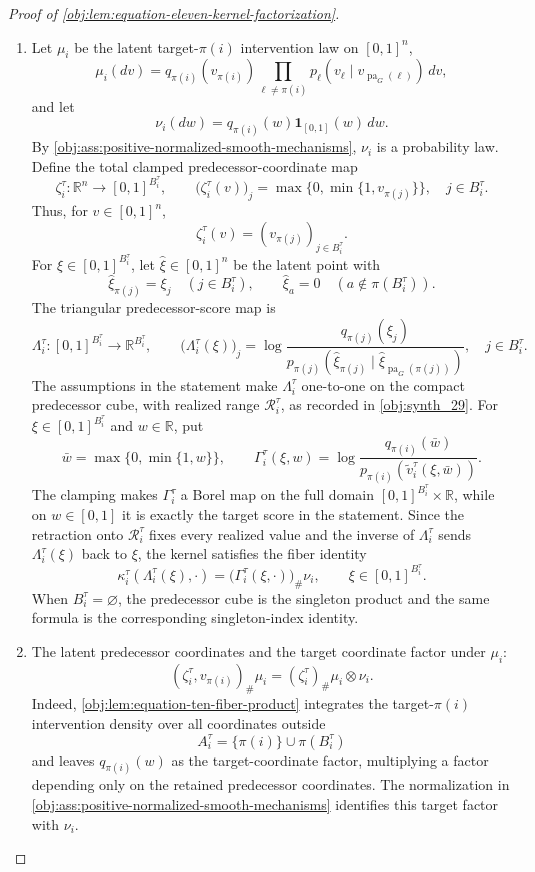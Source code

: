 \documentclass[11pt]{article}
\begin{document}
\begin{proof}[Proof of \cref{obj:lem:equation-eleven-kernel-factorization}]
\begin{enumerate}
\item Let \(\mu_i\) be the latent target-\(\pi(i)\) intervention law on \([0,1]^n\),
\[
\mu_i(dv)
=
q_{\pi(i)}(v_{\pi(i)})
\prod_{\ell\ne \pi(i)}
p_\ell(v_\ell\mid v_{\operatorname{pa}_G(\ell)})\,dv,
\]
and let
\[
\nu_i(dw)=q_{\pi(i)}(w)\mathbf 1_{[0,1]}(w)\,dw .
\]
By \cref{obj:ass:positive-normalized-smooth-mechanisms}, \(\nu_i\) is a probability law. Define the total clamped predecessor-coordinate map
\[
\zeta_i^\tau:\mathbb R^n\longrightarrow [0,1]^{B_i^\tau},
\qquad
\bigl(\zeta_i^\tau(v)\bigr)_j
=
\max\{0,\min\{1,v_{\pi(j)}\}\},
\quad j\in B_i^\tau .
\]
Thus, for \(v\in[0,1]^n\),
\[
\zeta_i^\tau(v)=(v_{\pi(j)})_{j\in B_i^\tau}.
\]
For \(\xi\in[0,1]^{B_i^\tau}\), let \(\widehat \xi\in[0,1]^n\) be the latent point with
\[
\widehat \xi_{\pi(j)}=\xi_j\quad (j\in B_i^\tau),
\qquad
\widehat \xi_a=0\quad (a\notin \pi(B_i^\tau)).
\]
The triangular predecessor-score map is
\[
\Lambda_i^\tau:[0,1]^{B_i^\tau}\to\mathbb R^{B_i^\tau},
\qquad
\bigl(\Lambda_i^\tau(\xi)\bigr)_j
=
\log
\frac{q_{\pi(j)}(\xi_j)}
{p_{\pi(j)}\!\left(\widehat \xi_{\pi(j)}\mid
\widehat \xi_{\operatorname{pa}_G(\pi(j))}\right)},
\quad j\in B_i^\tau .
\]
The assumptions in the statement make \(\Lambda_i^\tau\) one-to-one on the compact predecessor cube, with realized range \(\mathcal R_i^\tau\), as recorded in \cref{obj:synth_29}. For \(\xi\in[0,1]^{B_i^\tau}\) and \(w\in\mathbb R\), put
\[
\bar w=\max\{0,\min\{1,w\}\},
\qquad
\Gamma_i^\tau(\xi,w)
=
\log
\frac{q_{\pi(i)}(\bar w)}
{p_{\pi(i)}\!\left(\widetilde v_i^\tau(\xi,\bar w)\right)} .
\]
The clamping makes \(\Gamma_i^\tau\) a Borel map on the full domain
\([0,1]^{B_i^\tau}\times\mathbb R\), while on \(w\in[0,1]\) it is exactly the target score in the statement. Since the retraction onto \(\mathcal R_i^\tau\) fixes every realized value and the inverse of \(\Lambda_i^\tau\) sends \(\Lambda_i^\tau(\xi)\) back to \(\xi\), the kernel satisfies the fiber identity
\[
\kappa_i^\tau(\Lambda_i^\tau(\xi),\cdot)
=
\bigl(\Gamma_i^\tau(\xi,\cdot)\bigr)_{\#}\nu_i,
\qquad
\xi\in[0,1]^{B_i^\tau}.
\]
When \(B_i^\tau=\varnothing\), the predecessor cube is the singleton product and the same formula is the corresponding singleton-index identity. %

\item The latent predecessor coordinates and the target coordinate factor under \(\mu_i\):
\[
(\zeta_i^\tau,v_{\pi(i)})_{\#}\mu_i
=
(\zeta_i^\tau)_{\#}\mu_i\otimes \nu_i .
\]
Indeed, \cref{obj:lem:equation-ten-fiber-product} integrates the target-\(\pi(i)\) intervention density over all coordinates outside
\[
A_i^\tau=\{\pi(i)\}\cup \pi(B_i^\tau)
\]
and leaves \(q_{\pi(i)}(w)\) as the target-coordinate factor, multiplying a factor depending only on the retained predecessor coordinates. The normalization in \cref{obj:ass:positive-normalized-smooth-mechanisms} identifies this target factor with \(\nu_i\). %


\end{enumerate}
\end{proof}
\end{document}
